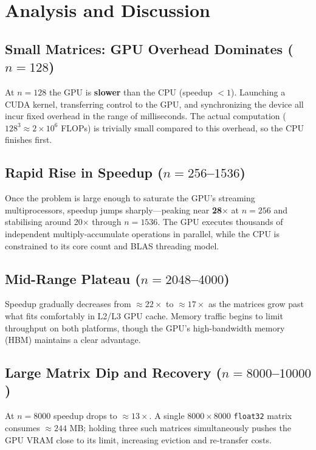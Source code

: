 \documentclass[12pt, a4paper]{article}
\begin{document}
\section{Analysis and Discussion}

\subsection{Small Matrices: GPU Overhead Dominates ($n = 128$)}

At $n = 128$ the GPU is \textbf{slower} than the CPU (speedup $< 1$).  Launching a CUDA kernel, transferring control to the GPU, and synchronizing the device all incur fixed overhead in the range of milliseconds.  The actual computation ($128^3 \approx 2 \times 10^6$ FLOPs) is trivially small compared to this overhead, so the CPU finishes first.

\subsection{Rapid Rise in Speedup ($n = 256$--$1536$)}

Once the problem is large enough to saturate the GPU's streaming multiprocessors, speedup jumps sharply---peaking near \textbf{28$\times$} at $n = 256$ and stabilising around 20$\times$ through $n = 1536$.  The GPU executes thousands of independent multiply-accumulate operations in parallel, while the CPU is constrained to its core count and BLAS threading model.

\subsection{Mid-Range Plateau ($n = 2048$--$4000$)}

Speedup gradually decreases from $\approx 22\times$ to $\approx 17\times$ as the matrices grow past what fits comfortably in L2/L3 GPU cache.  Memory traffic begins to limit throughput on both platforms, though the GPU's high-bandwidth memory (HBM) maintains a clear advantage.
\clearpage
\subsection{Large Matrix Dip and Recovery ($n = 8000$--$10000$)}

At $n = 8000$ speedup drops to $\approx 13\times$.  A single $8000 \times 8000$ \texttt{float32} matrix consumes $\approx 244$ MB; holding three such matrices simultaneously pushes the GPU VRAM close to its limit, increasing eviction and re-transfer costs.
\end{document}
